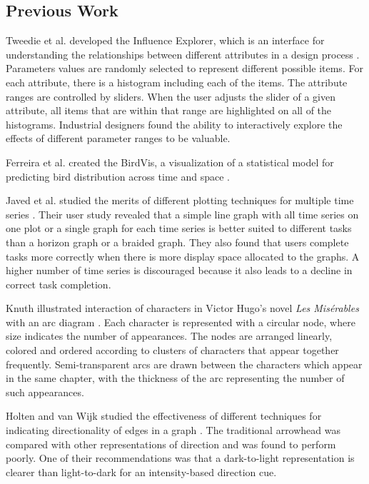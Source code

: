 \documentclass{article}
\begin{document}
\subsection{Previous Work}

Tweedie et al. developed the Influence Explorer, which is an interface for understanding the relationships between different attributes in a design process \cite{conf/chi/TweedieSDS95}.  Parameters values are randomly selected to represent different possible items.  For each attribute, there is a histogram including each of the items.  The attribute ranges are controlled by sliders.  When the user adjusts the slider of a given attribute, all items that are within that range are highlighted on all of the histograms.  Industrial designers found the ability to interactively explore the effects of different parameter ranges to be valuable.

Ferreira et al. created the BirdVis, a visualization of a statistical model for predicting bird distribution across time and space \cite{Ferreira:6065004}.

Javed et al. studied the merits of different plotting techniques for multiple time series \cite{Javed:2010:GPM:1907651.1907971}.  Their user study revealed that a simple line graph with all time series on one plot or a single graph for each time series is better suited to different tasks than a horizon graph or a braided graph.  They also found that users complete tasks more correctly when there is more display space allocated to the graphs.  A higher number of time series is discouraged because it also leads to a decline in correct task completion.

Knuth illustrated interaction of characters in Victor Hugo's novel \textit{Les Mis\'erables} with an arc diagram \cite{Knuth:1993:SGP:164984}.  Each character is represented with a circular node, where size indicates the number of appearances.  The nodes are arranged linearly, colored and ordered according to clusters of characters that appear together frequently.  Semi-transparent arcs are drawn between the characters which appear in the same chapter, with the thickness of the arc representing the number of such appearances.  %

Holten and van Wijk studied the effectiveness of different techniques for indicating directionality of edges in a graph \cite{Holten:2009:USV:1518701.1519054}.  The traditional arrowhead was compared with other representations of direction and was found to perform poorly.  One of their recommendations was that a dark-to-light representation is clearer than light-to-dark for an intensity-based direction cue.
\end{document}

